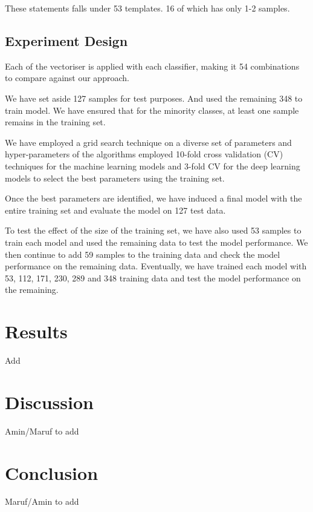\documentclass[runningheads]{llncs}
\begin{document}
These statements falls under 53 templates. 16 of which has only 1-2 samples.%

\subsection{Experiment Design}
Each of the vectoriser is applied with each classifier, making it 54 combinations to compare against our approach.

We have set aside 127 samples for test purposes. And used the remaining 348 to train model. We have ensured that for the minority classes, at least one sample remains in the training set.

We have employed a grid search technique on a diverse set of parameters and hyper-parameters of the algorithms employed 10-fold cross validation (CV) techniques for the machine learning models and 3-fold CV for the deep learning models to select the best parameters using the training set.

Once the best parameters are identified, we have induced a final model with the entire training set and evaluate the model on 127 test data.

To test the effect of the size of the training set, we have also used 53 samples to train each model and used the remaining data to test the model performance. We then continue to add 59 samples to the training data and check the model performance on the remaining data. Eventually, we have trained each model with 53, 112, 171, 230, 289 and 348 training data and test the model performance on the remaining. 

\section{Results}\label{result}
Add

\section{Discussion}\label{discuss}
Amin/Maruf to add

\section{Conclusion}\label{conc}
Maruf/Amin to add

%
%
%
% 
% 
%
{}

\end{document}
